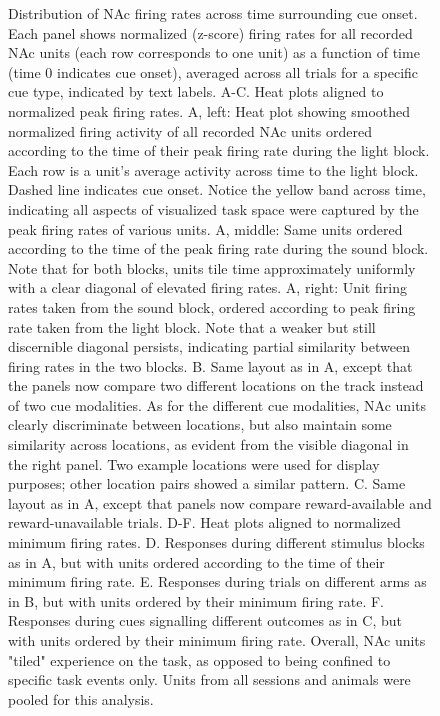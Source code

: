 \documentclass[11pt]{article}
\begin{document}
\begin{figure}[h]
\caption{Distribution of NAc firing rates across time surrounding cue onset. Each panel shows normalized (z-score) firing rates for all recorded NAc units (each row corresponds to one unit) as a function of time (time 0 indicates cue onset), averaged across all trials for a specific cue type, indicated by text labels. A-C. Heat plots aligned to normalized peak firing rates. A, left: Heat plot showing smoothed normalized firing activity of all recorded NAc units ordered according to the time of their peak firing rate during the light block. Each row is a unit’s average activity across time to the light block. Dashed line indicates cue onset. Notice the yellow band across time, indicating all aspects of visualized task space were captured by the peak firing rates of various units. A, middle: Same units ordered according to the time of the peak firing rate during the sound block. Note that for both blocks, units tile time approximately uniformly with a clear diagonal of elevated firing rates. A, right: Unit firing rates taken from the sound block, ordered according to peak firing rate taken from the light block. Note that a weaker but still discernible diagonal persists, indicating partial similarity between firing rates in the two blocks. B. Same layout as in A, except that the panels now compare two different locations on the track instead of two cue modalities. As for the different cue modalities, NAc units clearly discriminate between locations, but also maintain some similarity across locations, as evident from the visible diagonal in the right panel. Two example locations were used for display purposes; other location pairs showed a similar pattern. C. Same layout as in A, except that panels now compare reward-available and reward-unavailable trials. D-F. Heat plots aligned to normalized minimum firing rates. D. Responses during different stimulus blocks as in A, but with units ordered according to the time of their minimum firing rate. E. Responses during trials on different arms as in B, but with units ordered by their minimum firing rate. F. Responses during cues signalling different outcomes as in C, but with units ordered by their minimum firing rate. Overall, NAc units "tiled" experience on the task, as opposed to being confined to specific task events only. Units from all sessions and animals were pooled for this analysis.}
\label{fig:tiling}
\end{figure}
 
\end{document}
